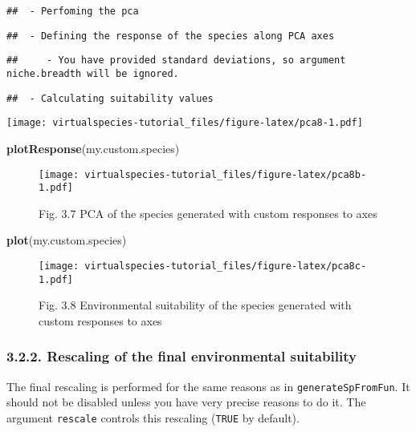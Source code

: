 \documentclass[]{article}
\newenvironment{Shaded}{\begin{snugshade}}{\end{snugshade}}
\newcommand{\KeywordTok}[1]{\textcolor[rgb]{0.13,0.29,0.53}{\textbf{#1}}}
\newcommand{\NormalTok}[1]{#1}
\begin{document}
\begin{verbatim}
##  - Perfoming the pca
\end{verbatim}

\begin{verbatim}
##  - Defining the response of the species along PCA axes
\end{verbatim}

\begin{verbatim}
##     - You have provided standard deviations, so argument niche.breadth will be ignored.
\end{verbatim}

\begin{verbatim}
##  - Calculating suitability values
\end{verbatim}

\texttt{[image: virtualspecies-tutorial\_files/figure-latex/pca8-1.pdf]}

\begin{Shaded}
\begin{Highlighting}[]
\KeywordTok{plotResponse}\NormalTok{(my.custom.species)}
\end{Highlighting}
\end{Shaded}

\begin{figure}
\centering
\texttt{[image: virtualspecies-tutorial\_files/figure-latex/pca8b-1.pdf]}
\caption{Fig. 3.7 PCA of the species generated with custom responses to
axes}
\end{figure}

\begin{Shaded}
\begin{Highlighting}[]
\KeywordTok{plot}\NormalTok{(my.custom.species)}
\end{Highlighting}
\end{Shaded}

\begin{figure}
\centering
\texttt{[image: virtualspecies-tutorial\_files/figure-latex/pca8c-1.pdf]}
\caption{Fig. 3.8 Environmental suitability of the species generated
with custom responses to axes}
\end{figure}

\subsubsection{3.2.2. Rescaling of the final environmental
suitability}\label{rescaling-of-the-final-environmental-suitability-1}

The final rescaling is performed for the same reasons as in
\texttt{generateSpFromFun}. It should not be disabled unless you have
very precise reasons to do it. The argument \texttt{rescale} controls
this rescaling (\texttt{TRUE} by default).
\end{document}
